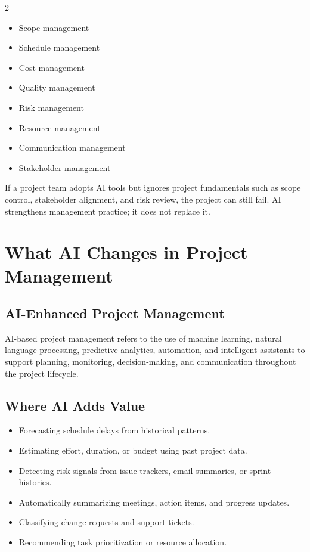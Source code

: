 \documentclass[11pt,a4paper]{article}
\begin{document}
\begin{multicols}{2}
\begin{itemize}[leftmargin=1.2em]
  \item Scope management
  \item Schedule management
  \item Cost management
  \item Quality management
  \item Risk management
  \item Resource management
  \item Communication management
  \item Stakeholder management
\end{itemize}
\end{multicols}

\begin{alertbox}
If a project team adopts AI tools but ignores project fundamentals such as scope control, stakeholder alignment, and risk review, the project can still fail. AI strengthens management practice; it does not replace it.
\end{alertbox}

\section{What AI Changes in Project Management}

\subsection{AI-Enhanced Project Management}

\begin{definitionbox}
AI-based project management refers to the use of machine learning, natural language processing, predictive analytics, automation, and intelligent assistants to support planning, monitoring, decision-making, and communication throughout the project lifecycle.
\end{definitionbox}

\subsection{Where AI Adds Value}

\begin{itemize}[leftmargin=*]
  \item Forecasting schedule delays from historical patterns.
  \item Estimating effort, duration, or budget using past project data.
  \item Detecting risk signals from issue trackers, email summaries, or sprint histories.
  \item Automatically summarizing meetings, action items, and progress updates.
  \item Classifying change requests and support tickets.
  \item Recommending task prioritization or resource allocation.
\end{itemize}
\end{document}

